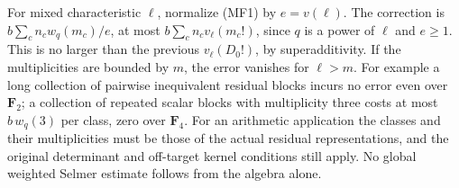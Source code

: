 For mixed characteristic \(\ell\), normalize (MF1) by \(e=v(\ell)\).
The correction is \(b\sum_c n_c w_q(m_c)/e\), at most
\(b\sum_c n_c v_\ell(m_c!)\), since \(q\) is a power of \(\ell\)
and \(e\ge1\). This is no larger than the previous
\(v_\ell(D_0!)\), by superadditivity. If the multiplicities
are bounded by \(m\), the error vanishes for \(\ell>m\).
For example a long collection of pairwise inequivalent residual
blocks incurs no error even over \(\mathbf F_2\); a collection of
repeated scalar blocks with multiplicity three costs at most
\(b\,w_q(3)\) per class, zero over \(\mathbf F_4\).
For an arithmetic application the classes and their multiplicities
must be those of the actual residual representations, and the
original determinant and off-target kernel conditions still apply.
No global weighted Selmer estimate follows from the algebra alone.
